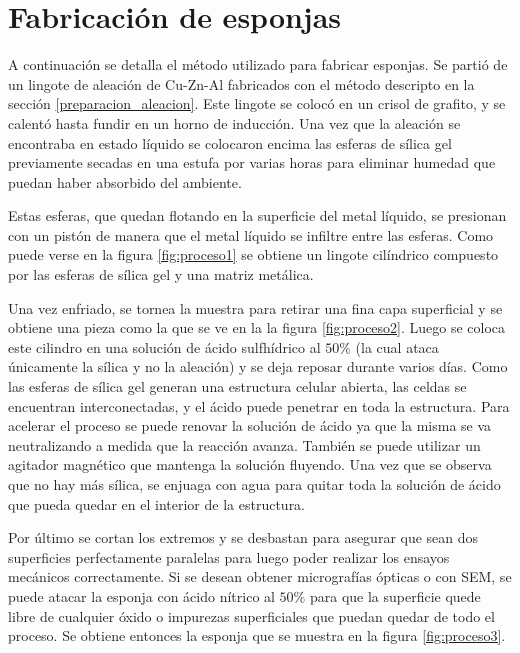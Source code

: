 \documentclass[a4paper,12pt,fleqn,twoside,openany]{book}
\begin{document}
\section{Fabricación de esponjas} \label{FabricacionEsponjas}

A continuación se detalla el método utilizado para fabricar esponjas. Se partió de un lingote de aleación de Cu-Zn-Al fabricados con el método descripto en la sección \ref{preparacion_aleacion}. Este lingote se colocó en un crisol de grafito, y se calentó hasta fundir en un horno de inducción. Una vez que la aleación se encontraba en estado líquido se colocaron encima las esferas de sílica gel previamente secadas en una estufa por varias horas para eliminar humedad que puedan haber absorbido del ambiente.

Estas esferas, que quedan flotando en la superficie del metal líquido, se presionan con un pistón de manera que el metal líquido se infiltre entre las esferas. Como puede verse en la figura \ref{fig:proceso1} se obtiene un lingote cilíndrico compuesto por las esferas de sílica gel y una matriz metálica.

Una vez enfriado, se tornea la muestra para retirar una fina capa superficial y se obtiene una pieza como la que se ve en la la figura \ref{fig:proceso2}. Luego se coloca este cilindro en una solución de ácido sulfhídrico al $50\%$ (la cual ataca únicamente la sílica y no la aleación) y se deja reposar durante varios días. Como las esferas de sílica gel generan una estructura celular abierta, las celdas se encuentran interconectadas, y el ácido puede penetrar en toda la estructura.  Para acelerar el proceso se puede renovar la solución de ácido ya que la misma se va neutralizando a medida que la reacción avanza. También se puede utilizar un agitador magnético que mantenga la solución fluyendo. Una vez que se observa que no hay más sílica, se enjuaga con agua para quitar toda la solución de ácido que pueda quedar en el interior de la estructura.

Por último se cortan los extremos y se desbastan para asegurar que sean dos superficies perfectamente paralelas para luego poder realizar los
ensayos mecánicos correctamente. Si se desean obtener micrografías ópticas o con SEM, se puede atacar  la esponja con ácido nítrico al $50\%$ para que la superficie quede libre de cualquier óxido o impurezas superficiales que puedan quedar de todo el proceso. Se obtiene entonces la esponja que se muestra en la figura \ref{fig:proceso3}.
\end{document}
